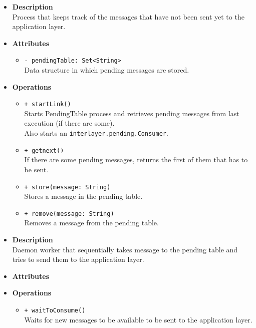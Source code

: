 \FloatBarrier
\begin{itemize}
  \item \textbf{Description} \\
    Process that keeps track of the messages that have not been sent yet to
    the application layer.
  \item \textbf{Attributes}
    \begin{itemize}
      \item \texttt{- pendingTable: Set<String>} \\
    Data structure in which pending messages are stored.
    \end{itemize}
  \item \textbf{Operations}
  \begin{itemize}
    \item \texttt{+ startLink()} \\
    Starts PendingTable process and retrieves pending messages from last
    execution (if there are some). \\
    Also starts an \texttt{interlayer.pending.Consumer}.
    \item \texttt{+ getnext()} \\
    If there are some pending messages, returns the first of them that has to
    be sent.
    \item \texttt{+ store(message: String)} \\
    Stores a message in the pending table.
    \item \texttt{+ remove(message: String)} \\
    Removes a message from the pending table.
  \end{itemize}
\end{itemize}

\FloatBarrier
\begin{itemize}
  \item \textbf{Description} \\
    Daemon worker that sequentially takes message to the pending table and
    tries to send them to the application layer.
  \item \textbf{Attributes}
  \item \textbf{Operations}
  \begin{itemize}
    \item \texttt{+ waitToConsume()} \\
    Waits for new messages to be available to be sent to the application layer.
  \end{itemize}
\end{itemize}

